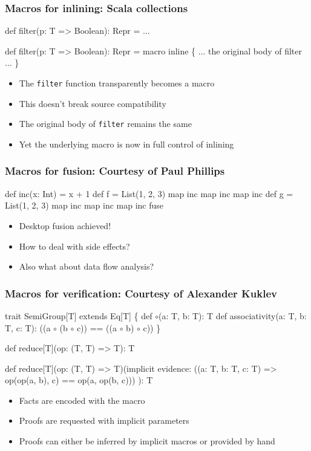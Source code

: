 \documentclass[hyperref={bookmarks=false}]{beamer}
\begin{document}
\begin{frame}[fragile]
\frametitle{Macros for inlining: Scala collections}
\begin{semiverbatim}
def filter(p: T => Boolean): Repr = ...

def filter(p: T => Boolean): Repr = macro inline \{
  ... the original body of filter ...
\}

\end{semiverbatim}

\begin{itemize}
\item The \texttt{filter} function transparently becomes a macro
\item This doesn't break source compatibility
\item The original body of \texttt{filter} remains the same
\item Yet the underlying macro is now in full control of inlining
\end{itemize}
\end{frame}

\begin{frame}[fragile]
\frametitle{Macros for fusion: Courtesy of Paul Phillips}
\begin{semiverbatim}
def inc(x: Int) = x + 1
def f = List(1, 2, 3) map inc map inc map inc
def g = List(1, 2, 3) map inc map inc map inc fuse

\end{semiverbatim}

\begin{itemize}
\item Desktop fusion achieved!
\item How to deal with side effects?
\item Also what about data flow analysis?
\end{itemize}
\end{frame}

\begin{frame}[fragile]
\frametitle{Macros for verification: Courtesy of Alexander Kuklev}
\begin{semiverbatim}
trait SemiGroup[T] extends Eq[T] \{
  def \ensuremath{\circ}(a: T, b: T): T
  def associativity(a: T, b: T, c: T):
    ((a \ensuremath{\circ} (b \ensuremath{\circ} c)) == ((a \ensuremath{\circ} b) \ensuremath{\circ} c))
\}

def reduce[T](op: (T, T) => T): T

def reduce[T](op: (T, T) => T)(implicit evidence:
  ((a: T, b: T, c: T) => op(op(a, b), c) == op(a, op(b, c)))
): T
\end{semiverbatim}

\begin{itemize}
\item Facts are encoded with the  macro
\item Proofs are requested with implicit parameters
\item Proofs can either be inferred by implicit macros or provided by hand
\end{itemize}
\end{frame}
\end{document}

